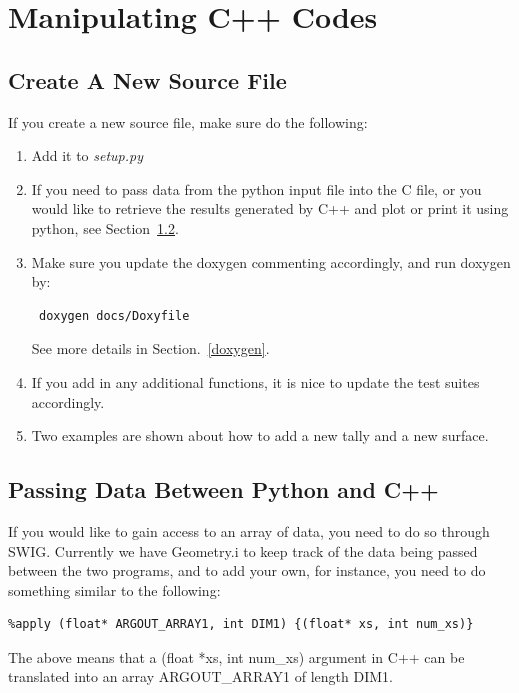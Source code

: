 \documentclass[titlepage]{article}
\begin{document}
\clearpage
\section{Manipulating C++ Codes}\label{C++}
\subsection{Create A New Source File}
If you create a new source file, make sure do the following: 
\begin{enumerate}
\item Add it to \textit{setup.py}

\item If you need to pass data from the python input file into the C file, or you would like to retrieve the results generated by C++ and plot or print it using python, see Section~\ref{data}. 

\item Make sure you update the doxygen commenting accordingly, and run doxygen by:
\begin{verbatim}
 doxygen docs/Doxyfile
\end{verbatim}
See more details in Section.~\ref{doxygen}. 

\item If you add in any additional functions, it is nice to update the test suites accordingly. 

\item Two examples are shown about how to add a new tally and a new surface. 
\end{enumerate}



\clearpage
\subsection{Passing Data Between Python and C++} \label{data}
If you would like to gain access to an array of data, you need to do so through SWIG. Currently we have Geometry.i to keep track of the data being passed between the two programs, and to add your own, for instance, you need to do something similar to the following: 
\begin{verbatim}
%apply (float* ARGOUT_ARRAY1, int DIM1) {(float* xs, int num_xs)}
\end{verbatim}
The above means that a (float *xs, int num\_xs) argument in C++ can be translated into an array ARGOUT\_ARRAY1 of length DIM1. 
\end{document}
